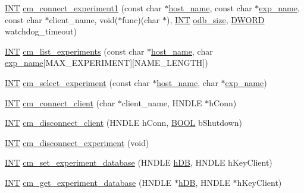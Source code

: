 \begin{DoxyCompactItemize}
\item 
\hyperlink{vppg_8h_a392e62da233ed3e2f7c3fd4f487a3896}{INT} \hyperlink{group__cmfunctionc_ga4dfbe7e4683c5f1e7f7cc1f6f998bdda}{cm\_\-connect\_\-experiment1} (const char $\ast$\hyperlink{mevb_8c_af65cc3664520b7cd0817adc7106f9624}{host\_\-name}, const char $\ast$\hyperlink{mfe_8c_a11eee1a5e2cef985b90bdfe0bfc8cf76}{exp\_\-name}, const char $\ast$client\_\-name, void($\ast$func)(char $\ast$), \hyperlink{vppg_8h_a392e62da233ed3e2f7c3fd4f487a3896}{INT} \hyperlink{analyzer_8c_a7503268889a084b74a968787ffc025b7}{odb\_\-size}, \hyperlink{vt2_8h_a798af1e30bc65f319c1a246cecf59e39}{DWORD} watchdog\_\-timeout)
\item 
\hyperlink{vppg_8h_a392e62da233ed3e2f7c3fd4f487a3896}{INT} \hyperlink{group__cmfunctionc_gad7e8e8d4f9d89c17133b09505539b351}{cm\_\-list\_\-experiments} (const char $\ast$\hyperlink{mevb_8c_af65cc3664520b7cd0817adc7106f9624}{host\_\-name}, char \hyperlink{mfe_8c_a11eee1a5e2cef985b90bdfe0bfc8cf76}{exp\_\-name}\mbox{[}MAX\_\-EXPERIMENT\mbox{]}\mbox{[}NAME\_\-LENGTH\mbox{]})
\item 
\hyperlink{vppg_8h_a392e62da233ed3e2f7c3fd4f487a3896}{INT} \hyperlink{group__cmfunctionc_ga5b4ff6bff1fa714ea4697e317d39ea0f}{cm\_\-select\_\-experiment} (const char $\ast$\hyperlink{mevb_8c_af65cc3664520b7cd0817adc7106f9624}{host\_\-name}, char $\ast$\hyperlink{mfe_8c_a11eee1a5e2cef985b90bdfe0bfc8cf76}{exp\_\-name})
\item 
\hyperlink{vppg_8h_a392e62da233ed3e2f7c3fd4f487a3896}{INT} \hyperlink{group__cmfunctionc_ga6a8a21234c7ce94bdf26bbcbcf778a39}{cm\_\-connect\_\-client} (char $\ast$client\_\-name, HNDLE $\ast$hConn)
\item 
\hyperlink{vppg_8h_a392e62da233ed3e2f7c3fd4f487a3896}{INT} \hyperlink{group__cmfunctionc_ga084b807db46901ac411824a94f59645d}{cm\_\-disconnect\_\-client} (HNDLE hConn, \hyperlink{vt2_8h_a239c7f0d40651c3e419c5b9651507d14}{BOOL} bShutdown)
\item 
\hyperlink{vppg_8h_a392e62da233ed3e2f7c3fd4f487a3896}{INT} \hyperlink{group__cmfunctionc_ga7d5a287821786e8dde3d2340826215b2}{cm\_\-disconnect\_\-experiment} (void)
\item 
\hyperlink{vppg_8h_a392e62da233ed3e2f7c3fd4f487a3896}{INT} \hyperlink{group__cmfunctionc_gadf088255bf3e91f3efe83c7e5f0cd733}{cm\_\-set\_\-experiment\_\-database} (HNDLE \hyperlink{mevb_8c_ab1f60c53f74e806a3b9f687af38d7421}{hDB}, HNDLE hKeyClient)
\item 
\hyperlink{vppg_8h_a392e62da233ed3e2f7c3fd4f487a3896}{INT} \hyperlink{group__cmfunctionc_ga16b33b70783a3f5ba98b4094149d12b7}{cm\_\-get\_\-experiment\_\-database} (HNDLE $\ast$\hyperlink{mevb_8c_ab1f60c53f74e806a3b9f687af38d7421}{hDB}, HNDLE $\ast$hKeyClient)

\end{DoxyCompactItemize}

